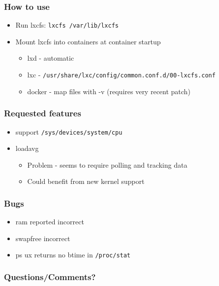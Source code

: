 \documentclass{beamer}
\begin{document}
\lstset{language=bash}

\begin{frame}
\frametitle{How to use}
\begin{itemize}
\item Run lxcfs: {\tt lxcfs /var/lib/lxcfs}

\item Mount lxcfs into containers at container startup
	\begin{itemize}
	\item lxd - automatic
	\item lxc - {\tt /usr/share/lxc/config/common.conf.d/00-lxcfs.conf}
	\item docker - map files with -v (requires very recent patch)
	\end{itemize}
\end{itemize}

\newpage

{\tiny

}
\end{frame}

\begin{frame}
\frametitle{Requested features}
	\begin{itemize}
	\item support {\tt /sys/devices/system/cpu}
	\item loadavg
		\begin{itemize}
		\item Problem - seems to require polling and tracking data
		\item Could benefit from new kernel support
		\end{itemize}
	\end{itemize}
\end{frame}

\begin{frame}
\frametitle{Bugs}
	\begin{itemize}
	\item ram reported incorrect
	\item swapfree incorrect
	\item ps ux returns no btime in {\tt /proc/stat}
	\end{itemize}
\end{frame}

\begin{frame}
\frametitle{Questions/Comments?}
\end{frame}

\end{document}
